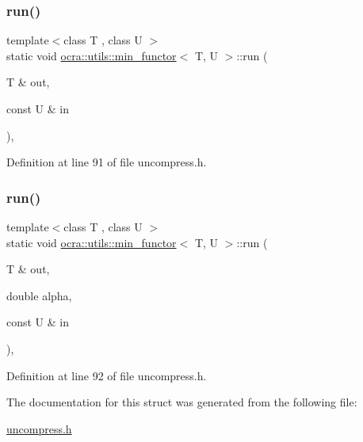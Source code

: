 \subsubsection{\texorpdfstring{run()}{run()}\hspace{0.1cm}{\footnotesize\ttfamily [1/2]}}
{\footnotesize\ttfamily template$<$class T , class U $>$ \\
static void \hyperlink{structocra_1_1utils_1_1min__functor}{ocra\+::utils\+::min\+\_\+functor}$<$ T, U $>$\+::run (\begin{DoxyParamCaption}\item[{T \&}]{out,  }\item[{const U \&}]{in }\end{DoxyParamCaption})\hspace{0.3cm}{\ttfamily [inline]}, {\ttfamily [static]}}



Definition at line 91 of file uncompress.\+h.

\hypertarget{structocra_1_1utils_1_1min__functor_ab4644d20e3335904183c8f9f5b7eb097}{}\label{structocra_1_1utils_1_1min__functor_ab4644d20e3335904183c8f9f5b7eb097} 
\subsubsection{\texorpdfstring{run()}{run()}\hspace{0.1cm}{\footnotesize\ttfamily [2/2]}}
{\footnotesize\ttfamily template$<$class T , class U $>$ \\
static void \hyperlink{structocra_1_1utils_1_1min__functor}{ocra\+::utils\+::min\+\_\+functor}$<$ T, U $>$\+::run (\begin{DoxyParamCaption}\item[{T \&}]{out,  }\item[{double}]{alpha,  }\item[{const U \&}]{in }\end{DoxyParamCaption})\hspace{0.3cm}{\ttfamily [inline]}, {\ttfamily [static]}}



Definition at line 92 of file uncompress.\+h.



The documentation for this struct was generated from the following file\+:\begin{DoxyCompactItemize}
\item 
\hyperlink{uncompress_8h}{uncompress.\+h}\end{DoxyCompactItemize}
